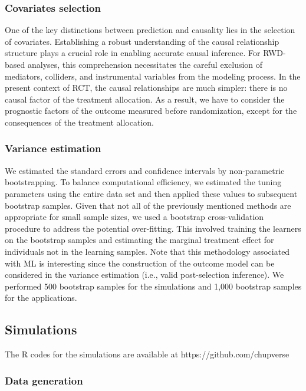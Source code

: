 \documentclass{article}
\begin{document}
\subsubsection{Covariates selection}

One of the key distinctions between prediction and causality lies in the selection of covariates. Establishing a robust understanding of the causal relationship structure plays a crucial role in enabling accurate causal inference.  For RWD-based analyses, this comprehension necessitates the careful exclusion of mediators,  colliders,  and instrumental variables from the modeling process. In the present context of RCT, the causal relationships are much simpler: there is no causal factor of the treatment allocation.  As a result,  we have to consider the prognostic factors of the outcome measured before randomization, except for the consequences of the treatment allocation. 

\subsubsection{Variance estimation}

We estimated the standard errors and confidence intervals by non-parametric bootstrapping.  To balance computational efficiency,  we estimated the tuning parameters using the entire data set and then applied these values to subsequent bootstrap samples. 
Given that not all of the previously mentioned methods are appropriate for small sample sizes,\cite{riley_penalization_2021} we used a bootstrap cross-validation procedure to address the potential over-fitting. This involved training the learners on the bootstrap samples and estimating the marginal treatment effect for individuals not in the learning samples.
Note that this methodology associated with ML is interesting since the construction of the outcome model can be considered in the variance estimation (i.e., valid post-selection inference).  We performed 500 bootstrap samples for the simulations and 1,000 bootstrap samples  for the applications.



\subsection{Simulations}

The R codes for the simulations are available at https://github.com/chupverse

\subsubsection{Data generation}
\end{document}
